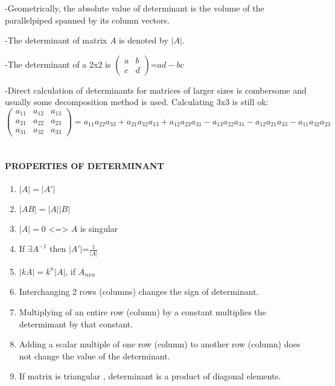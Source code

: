 \documentclass[]{article}
\let\oldparagraph\paragraph
\renewcommand{\paragraph}[1]{\oldparagraph{#1}\mbox{}}
\begin{document}
-Geometrically, the absolute value of determinant is the volume of the
parallelpiped spanned by its column vectors.

-The determinant of matrix \(A\) is denoted by \(|A|\).

-The determinant of a 2x2 is
\(\begin{pmatrix} a & b \\ c & d \end{pmatrix}\)=\(ad-bc\)

-Direct calculation of determinants for matrices of larger sizes is
combersome and usually some decomposition method is used. Calculating
3x3 is still ok:\\[2\baselineskip]
\[\begin{pmatrix} a_{11} & a_{12} & a_{13} \\ a_{21} & a_{22} & a_{23}\\a_{31} & a_{32} & a_{33} \end{pmatrix}=a_{11}a_{22}a_{33}+a_{21}a_{32}a_{13}+a_{12}a_{23}a_{31}-a_{13}a_{22}a_{31}-a_{12}a_{21}a_{33}-a_{11}a_{32}a_{23}\]\\

\paragraph{\texorpdfstring{PROPERTIES OF DETERMINANT\\
}{PROPERTIES OF DETERMINANT }}\label{properties-of-determinant}

\begin{enumerate}
\def\labelenumi{\alph{enumi})}
\item
  \(|A|=|A'|\)
\item
  \(|AB|=|A||B|\)
\item
  \(|A|=0\) \textless{}=\textgreater{} \(A\) is singular
\item
  If \(\exists A^{-1}\) then \(|A'|\)=\(\frac{1}{|A|}\)
\item
  \(|kA|= k^{n}|A|\), if \(A_{nxn}\)
\item
  Interchanging 2 rows (columns) changes the sign of determinant.
\item
  Multiplying of an entire row (column) by a constant multiplies the
  determimant by that constant.
\item
  Adding a scalar multiple of one row (column) to another row (column)
  does not change the value of the determinant.
\item
  If matrix is triangular , determinant is a product of diagonal
  elements.
\end{enumerate}
\end{document}
